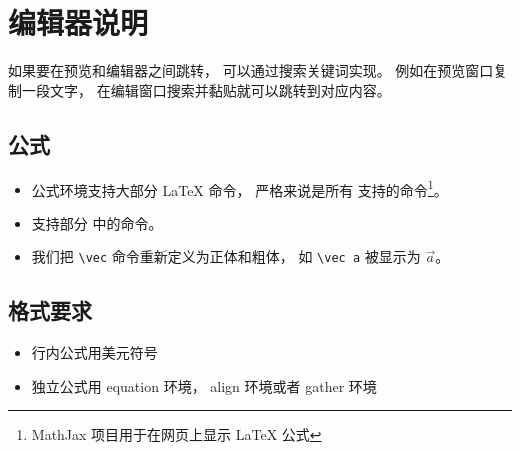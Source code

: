 \section{编辑器说明}
如果要在预览和编辑器之间跳转， 可以通过搜索关键词实现。 例如在预览窗口复制一段文字， 在编辑窗口搜索并黏贴就可以跳转到对应内容。

\subsection{公式}
\begin{itemize}
\item 公式环境支持大部分 LaTeX 命令， 严格来说是所有  支持的命令\footnote{MathJax 项目用于在网页上显示 LaTeX 公式}。
\item 支持部分 中的命令。
\item 我们把 \lstinline|\vec| 命令重新定义为正体和粗体， 如 \lstinline|\vec a| 被显示为 $\vec a$。
\end{itemize}

\subsection{格式要求}

\begin{itemize}
\item 行内公式用美元符号
\item 独立公式用 equation 环境， align 环境或者 gather 环境
\end{itemize}
